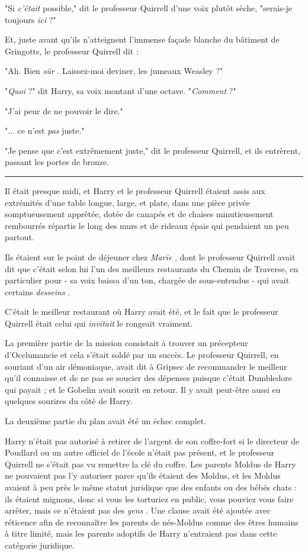 "Si \emph{c'était}  possible," dit le professeur Quirrell d'une voix plutôt sèche, "serais-je toujours \emph{ici } ?"

Et, juste avant qu'ils n'atteignent l'immense façade blanche du bâtiment de Gringotts, le professeur Quirrell dit :

"Ah. Bien \emph{sûr} . Laissez-moi deviner, les jumeaux Weasley ?"

"\emph{Quoi } ?" dit Harry, sa voix montant d'une octave. "\emph{Comment}  ?"

"J'ai peur de ne pouvoir le dire."

"... ce n'est \emph{pas}  juste."

"Je pense que c'est extrêmement juste," dit le professeur Quirrell, et ils entrèrent, passant les portes de bronze.
\par\noindent\rule{\textwidth}{0.4pt}
Il était presque midi, et Harry et le professeur Quirrell étaient assis aux extrémités d'une table longue, large, et plate, dans une pièce privée somptueusement apprêtée, dotée de canapés et de chaises minutieusement rembourrés répartis le long des murs et de rideaux épais qui pendaient un peu partout.

Ils étaient sur le point de déjeuner chez \emph{Marie} , dont le professeur Quirrell avait dit que c'était selon lui l'un des meilleurs restaurants du Chemin de Traverse, en particulier pour - sa voix baissa d'un ton, chargée de sous-entendus - qui avait certains \emph{desseins} .

C'était le meilleur restaurant où Harry avait été, et le fait que le professeur Quirrell était celui qui \emph{invitait}  le rongeait vraiment.

La première partie de la mission consistait à trouver un précepteur d'Occlumancie et cela s'était soldé par un succès. Le professeur Quirrell, en souriant d'un air démoniaque, avait dit à Gripsec de recommander le meilleur qu'il connaisse et de ne pas se soucier des dépenses puisque c'était Dumbledore qui payait ; et le Gobelin avait sourit en retour. Il y avait peut-être aussi eu quelques sourires du côté de Harry.

La deuxième partie du plan avait été un échec complet.

Harry n'était pas autorisé à retirer de l'argent de son coffre-fort si le directeur de Poudlard ou un autre officiel de l'école n'était pas présent, et le professeur Quirrell ne s'était pas vu remettre la clé du coffre. Les parents Moldus de Harry ne pouvaient pas l'y autoriser parce qu'ils étaient des Moldus, et les Moldus avaient à peu près le même statut juridique que des enfants ou des bébés chats : ils étaient mignons, donc si vous les torturiez en public, vous pouviez vous faire arrêter, mais ce n'étaient pas des \emph{gens} . Une clause avait été ajoutée avec réticence afin de reconnaître les parents de nés-Moldus comme des êtres humains à titre limité, mais les parents adoptifs de Harry n'entraient pas dans cette catégorie juridique.

